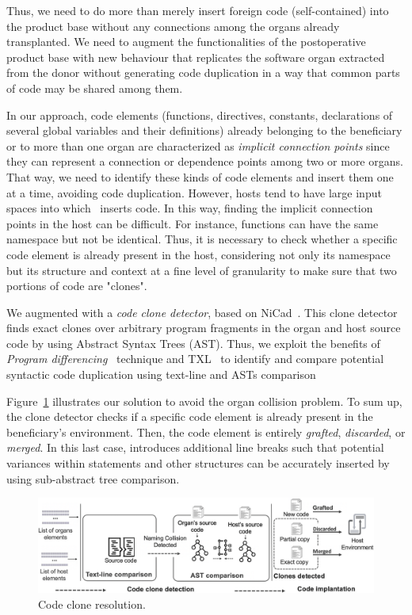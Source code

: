 Thus, we need to do more than merely insert foreign code (self-contained) into the product base without any connections among the organs already transplanted. We need to augment the functionalities of the postoperative product base with new behaviour that replicates the software organ extracted from the donor without generating code duplication in a way that common parts of code may be shared among them.

In our approach, code elements (functions, directives, constants, declarations of several global variables and their definitions) already belonging to the beneficiary or to more than one organ are characterized as \emph{implicit connection points} since they can represent a connection or dependence points among two or more organs. That way, we need to identify these kinds of code elements and insert them one at a time, avoiding code duplication. However, hosts tend to have large input spaces into which \autoscalpel~inserts code. In this way, finding the implicit connection points in the host can be difficult. For instance, functions can have the same namespace but not be identical. Thus, it is necessary to check whether a specific code element is already present in the host, considering not only its namespace but its structure and context at a fine level of granularity to make sure that two portions of code are "clones".

We augmented \autoscalpel with a \emph{code clone detector}, based on NiCad~\cite{Roy2009}.  This clone detector finds exact clones over arbitrary program fragments in the organ and host source code by using Abstract Syntax Trees (AST). Thus, we exploit the benefits of \emph{Program differencing}~\cite{Kernighan1983} technique and TXL~\cite{Cordy2006} to identify and compare potential syntactic code duplication using text-line and ASTs comparison~\cite{Roy2009}

Figure~\ref{fig:code_clone_analysis} illustrates our solution to avoid the organ collision problem. To sum up, the clone detector checks if a specific code element is already present in the beneficiary's environment. Then, the code element is entirely \emph{grafted}, \emph{discarded}, or \emph{merged}. In this last case, \autoscalpel introduces additional line breaks such that potential variances within statements and other structures can be accurately inserted by using sub-abstract tree comparison. 

\begin{figure}[t]
	\centering \includegraphics[width=\linewidth]{images/code_clone_analysis.png}
	\caption{Code clone resolution. }
	\label{fig:code_clone_analysis}
\end{figure} 


